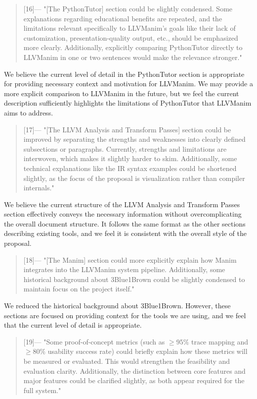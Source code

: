 \begin{quotation} [16]---%
  "[The PythonTutor] section could be slightly condensed. Some explanations regarding educational benefits are repeated, and the limitations relevant specifically to LLVManim’s goals like their lack of customization, presentation-quality output, etc., should be emphasized more clearly. Additionally, explicitly comparing PythonTutor directly to LLVManim in one or two sentences would make the relevance stronger."
\end{quotation}
\noindent We believe the current level of detail in the PythonTutor section is appropriate for providing necessary context and motivation for LLVManim. We may provide a more explicit comparison to LLVManim in the future, but we feel the current description sufficiently highlights the limitations of PythonTutor that LLVManim aims to address.

\begin{quotation} [17]---%
  "[The LLVM Analysis and Transform Passes] section could be improved by separating the strengths and weaknesses into clearly defined subsections or paragraphs. Currently, strengths and limitations are interwoven, which makes it slightly harder to skim. Additionally, some technical explanations like the IR syntax examples could be shortened slightly, as the focus of the proposal is visualization rather than compiler internals."
\end{quotation}
\noindent We believe the current structure of the LLVM Analysis and Transform Passes section effectively conveys the necessary information without overcomplicating the overall document structure. It follows the same format as the other sections describing existing tools, and we feel it is consistent with the overall style of the proposal.

\begin{quotation} [18]---%
  "[The Manim] section could more explicitly explain how Manim integrates into the LLVManim system pipeline. Additionally, some historical background about 3Blue1Brown could be slightly condensed to maintain focus on the project itself."
\end{quotation}
\noindent We reduced the historical background about 3Blue1Brown. However, these sections are focused on providing context for the tools we are using, and we feel that the current level of detail is appropriate.

\begin{quotation} [19]---%
  "Some proof-of-concept metrics (such as $\geq95\%$ trace mapping and $\geq80\%$ usability success rate) could briefly explain how these metrics will be measured or evaluated. This would strengthen the feasibility and evaluation clarity. Additionally, the distinction between core features and major features could be clarified slightly, as both appear required for the full system."
\end{quotation}

